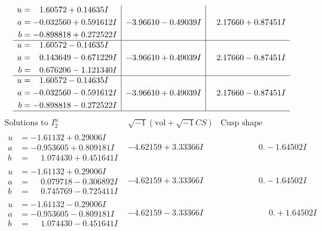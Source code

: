 \documentclass[1p]{elsarticle_modified}
\theoremstyle{definition}
\newcommand{\I}{\sqrt{-1}}
\begin{document}
$$\begin{array}{c|c|c}
\begin{aligned}
u &= \phantom{-}1.60572 + 0.14635 I \\
a &= -0.032560 + 0.591612 I \\
b &= -0.898818 + 0.272522 I\end{aligned}
 & -3.96610 - 0.49039 I & \phantom{-}2.17660 + 0.87451 I \\ \hline\begin{aligned}
u &= \phantom{-}1.60572 - 0.14635 I \\
a &= \phantom{-}0.143649 - 0.671229 I \\
b &= \phantom{-}0.676206 - 1.121340 I\end{aligned}
 & -3.96610 + 0.49039 I & \phantom{-}2.17660 - 0.87451 I \\ \hline\begin{aligned}
u &= \phantom{-}1.60572 - 0.14635 I \\
a &= -0.032560 - 0.591612 I \\
b &= -0.898818 - 0.272522 I\end{aligned}
 & -3.96610 + 0.49039 I & \phantom{-}2.17660 - 0.87451 I\\
 \hline 
 \end{array}$$\newpage$$\begin{array}{c|c|c}  
\text{Solutions to }I^u_{2}& \I (\text{vol} + \sqrt{-1}CS) & \text{Cusp shape}\\
 \hline 
\begin{aligned}
u &= -1.61132 + 0.29006 I \\
a &= -0.953605 + 0.809181 I \\
b &= \phantom{-}1.074430 + 0.451641 I\end{aligned}
 & -4.62159 + 3.33366 I & \phantom{-0.000000 } 0. - 1.64502 I \\ \hline\begin{aligned}
u &= -1.61132 + 0.29006 I \\
a &= \phantom{-}0.079718 - 0.306892 I \\
b &= \phantom{-}0.745769 - 0.725411 I\end{aligned}
 & -4.62159 + 3.33366 I & \phantom{-0.000000 } 0. - 1.64502 I \\ \hline\begin{aligned}
u &= -1.61132 - 0.29006 I \\
a &= -0.953605 - 0.809181 I \\
b &= \phantom{-}1.074430 - 0.451641 I\end{aligned}
 & -4.62159 - 3.33366 I & \phantom{-0.000000 -}0. + 1.64502 I \\ \hline\begin{aligned}

\end{aligned}
\end{array}$$
\end{document}
